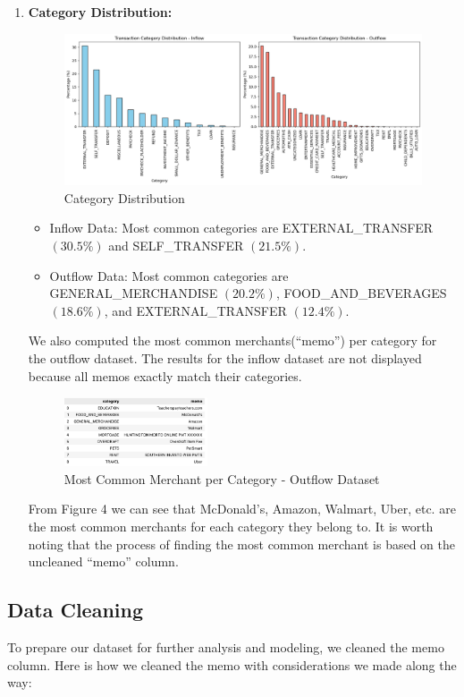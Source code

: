 \documentclass[12pt,letterpaper]{article}
\begin{document}
\begin{enumerate}
    \item{\textbf{Category Distribution:}}
    \begin{figure}[H]
        \centering
        \includegraphics[width=1.0\textwidth]{pngs/category_dist.png}
        \caption{Category Distribution}
        \label{fig:enter-label}
    \end{figure}
    \begin{itemize}
        \item Inflow Data: Most common categories are EXTERNAL\_TRANSFER $(30.5\%)$ and SELF\_TRANSFER $(21.5\%)$.
        \item Outflow Data: Most common categories are GENERAL\_MERCHANDISE $(20.2\%)$, FOOD\_AND\_BEVERAGES $(18.6\%)$, and EXTERNAL\_TRANSFER $(12.4\%)$.
    \end{itemize}

    {We also computed the most common merchants(“memo”) per category for the outflow dataset. The results for the inflow dataset are not displayed because all memos exactly match their categories.}
    \begin{figure}[H]
        \centering
        \includegraphics[width=0.4\textwidth]{pngs/cmn_merchant.png}
        \caption{Most Common Merchant per Category - Outflow Dataset}
        \label{fig:enter-label}
    \end{figure}
    {From Figure 4 we can see that McDonald’s, Amazon, Walmart, Uber, etc. are the most common merchants for each category they belong to. It is worth noting that the process of finding the most common merchant is based on the uncleaned “memo” column.}
\end{enumerate}

\subsection{Data Cleaning}
{To prepare our dataset for further analysis and modeling, we cleaned the memo column.}
{Here is how we cleaned the memo with considerations we made along the way:}
\end{document}
